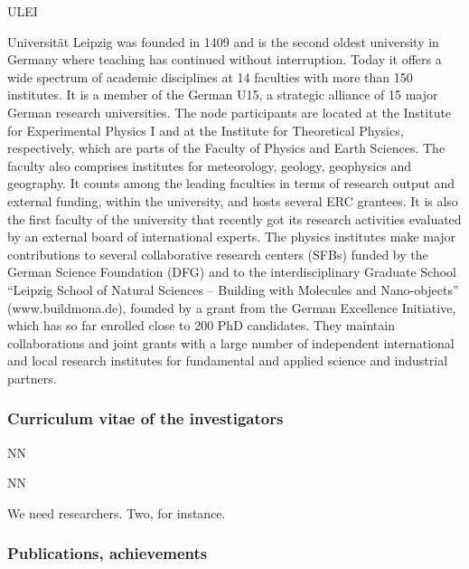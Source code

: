 \begin{sitedescription}{ULEI} \label{desc:ULEI}

 Universität Leipzig was founded in 1409 and is the second oldest university in Germany where teaching has continued without interruption. 
  Today it offers a wide spectrum of academic disciplines at 14 faculties with more than 150 institutes. 
  It is a member of the German U15, a strategic alliance of 15 major German research universities. 
  The node participants are located at the Institute for Experimental Physics I and at the Institute for Theoretical Physics, respectively, which are parts of the Faculty of Physics and Earth Sciences. 
  The faculty also comprises institutes for meteorology, geology, geophysics and geography. 
  It counts among the leading faculties in terms of research output and external funding, within the university, and hosts several ERC grantees. 
  It is also the first faculty of the university that recently got its research activities evaluated by an external board of international experts. 
  The physics institutes make major contributions to several collaborative research centers (SFBs) funded by the German Science Foundation (DFG) and to the interdisciplinary Graduate School ``Leipzig School of Natural Sciences -- Building with Molecules and Nano-objects'' (www.buildmona.de), founded by a grant from the German Excellence Initiative, which has so far enrolled close to 200 PhD candidates. 
  They maintain collaborations and joint grants with a large number of independent international and local research institutes for fundamental and applied science and industrial partners. 

\subsubsection*{Curriculum vitae of the investigators}




\begin{participant}[type=res,PM=48,salary=5500]{NN}
\end{participant}
\begin{participant}[type=res,PM=36,salary=5500]{NN}

We need researchers. Two, for instance.

\end{participant}

\subsubsection*{Publications, achievements}


\end{sitedescription}
